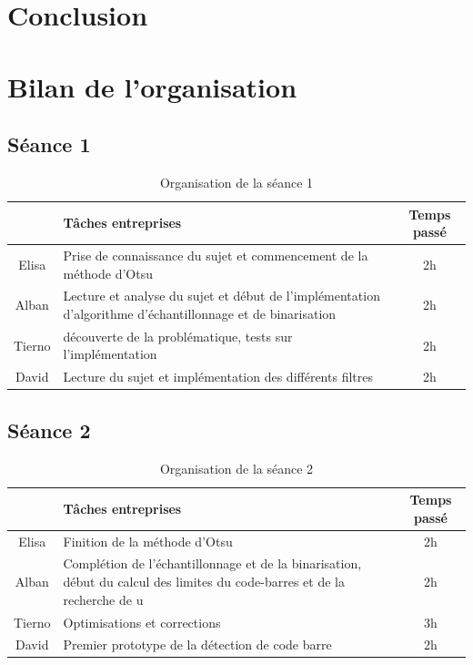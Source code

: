\documentclass{rapport}
\begin{document}
\newpage 

\section{Conclusion}

\section{Bilan de l'organisation}

\subsection{Séance 1}

\begin{table}[H]
	\centering 
	\begin{tabular}{c|p{12 cm}|c}
		& Tâches entreprises& Temps passé\\ \hline
		Elisa& Prise de connaissance du sujet et commencement de la méthode d'Otsu& 2h\\ \hline
		Alban& Lecture et analyse du sujet et début de l'implémentation d'algorithme d'échantillonnage et de binarisation& 2h\\ \hline
		Tierno & découverte de la problématique, tests sur l'implémentation & 2h\\ \hline
		David & Lecture du sujet et implémentation des différents filtres & 2h \\ \hline
	\end{tabular}
	\caption{Organisation de la séance 1}
\end{table}

\subsection{Séance 2}

\begin{table}[H]
	\centering 
	\begin{tabular}{c|p{12 cm}|c}
		& Tâches entreprises& Temps passé\\ \hline
		Elisa& Finition de la méthode d'Otsu & 2h\\ \hline
		Alban& Complétion de l'échantillonnage et de la binarisation, début du calcul des limites du code-barres et de la recherche de u& 2h\\ \hline
		Tierno & Optimisations et corrections & 3h\\ \hline
		David & Premier prototype de la détection de code barre &  2h \\ \hline
	\end{tabular}
	\caption{Organisation de la séance 2}
\end{table}
\end{document}
